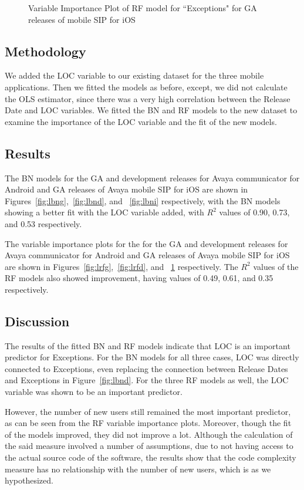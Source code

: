 \documentclass[smallcondensed]{svjour3}     %
\begin{document}
\begin{figure}[!t]
\begin{minipage}{.45\textwidth}
\caption{Variable Importance Plot of RF model for ``Exceptions" for GA releases of mobile SIP for iOS}
\label{fig:lrfi}
\end{minipage}
\end{figure}



\subsection*{Methodology}
We added the LOC variable to our existing dataset for the three mobile applications. Then we fitted the models as before, except, we did not calculate the OLS estimator, since there was a very high correlation between the Release Date and LOC variables. We fitted the BN and RF models to the new dataset to examine the importance of the LOC variable and the fit of the new models.

\subsection*{Results}

The BN models for the GA and development releases for Avaya communicator for Android and GA releases of Avaya mobile SIP for iOS are shown in Figures~\ref{fig:lbng},~\ref{fig:lbnd}, and ~\ref{fig:lbni} respectively, with the BN models showing a better fit with the LOC variable added, with $R^2$ values of 0.90, 0.73, and 0.53 respectively. 

The variable importance plots for the for the GA and development releases for Avaya communicator for Android and GA releases of Avaya mobile SIP for iOS are shown in Figures~\ref{fig:lrfg},~\ref{fig:lrfd}, and ~\ref{fig:lrfi} respectively. The $R^2$ values of the RF models also showed improvement, having values of 0.49, 0.61, and 0.35 respectively.

\subsection*{Discussion}

The results of the fitted BN and RF models indicate that LOC is an important predictor for Exceptions. For the BN models for all three cases, LOC was directly connected to Exceptions, even replacing the connection between Release Dates and Exceptions in Figure~\ref{fig:lbnd}. For the three RF models as well, the LOC variable was shown to be an important predictor. 

However, the number of new users still remained the most important predictor, as can be seen from the RF variable importance plots. Moreover, though the fit of the models improved, they did not improve a lot. Although the calculation of the said measure involved a number of assumptions, due to not having access to the actual source code of the software, the results show that the code complexity measure has no relationship with the number of new users, which is as we hypothesized. 
\end{document}
